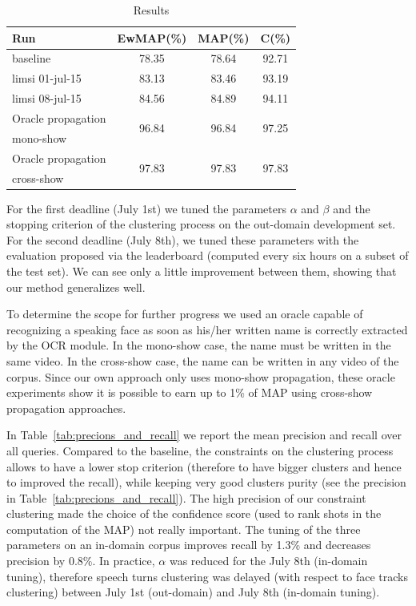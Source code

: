 \documentclass{acm_proc_article-me}
\begin{document}
\begin{table}[ht]
  \centering
  \begin{tabular}{|l|c|c|c|}
    \hline
	Run 											& EwMAP(\%)	& MAP(\%)	& C(\%) \\
	\hline
	\hline
	baseline										& 78.35		& 78.64		& 92.71		\\
	\hline
	limsi 01-jul-15 								& 83.13		& 83.46		& 93.19		\\
	limsi 08-jul-15 								& 84.56		& 84.89		& 94.11		\\
	\hline
	\hline
	Oracle propagation 	& \multirow{2}{*}{96.84}		& \multirow{2}{*}{96.84}		& \multirow{2}{*}{97.25}	\\
	mono-show			&							&							&			\\
	\hline
	Oracle propagation 	& \multirow{2}{*}{97.83}		& \multirow{2}{*}{97.83}		& \multirow{2}{*}{97.83}	\\
	cross-show 			&							&							&			\\
  	\hline
  \end{tabular}
  \caption{Results}
  \label{tab:results}
\end{table}

For the first deadline (July 1st) we tuned the parameters $\alpha$ and $\beta$ and the stopping criterion of the clustering process on the out-domain development set. For the second deadline (July 8th), we tuned these parameters with the evaluation proposed via the leaderboard (computed every six hours on a subset of the test set). We can see only a little improvement between them, showing that our method generalizes well.

To determine the scope for further progress we used an oracle capable of recognizing a speaking face as soon as his/her written name is correctly extracted by the OCR module. In the mono-show case, the name must be written in the same video. In the cross-show case, the name can be written in any video of the corpus. Since our own approach only uses mono-show propagation, these oracle experiments show it is possible to earn up to 1\% of MAP using cross-show propagation approaches.

In Table~\ref{tab:precions_and_recall} we report the mean precision and recall over all queries. Compared to the baseline, the constraints on the clustering process allows to have a lower stop criterion (therefore to have bigger clusters and hence to improved the recall), while keeping very good clusters purity (see the precision in Table~\ref{tab:precions_and_recall}). The high precision of our constraint clustering made the choice of the confidence score (used to rank shots in the computation of the MAP) not really important. The tuning of the three parameters on an in-domain corpus improves recall by 1.3\% and decreases precision by 0.8\%. In practice, $\alpha$ was reduced for the July 8th (in-domain tuning), therefore speech turns clustering was delayed (with respect to face tracks clustering) between July 1st (out-domain) and July 8th (in-domain tuning). 
\end{document}
